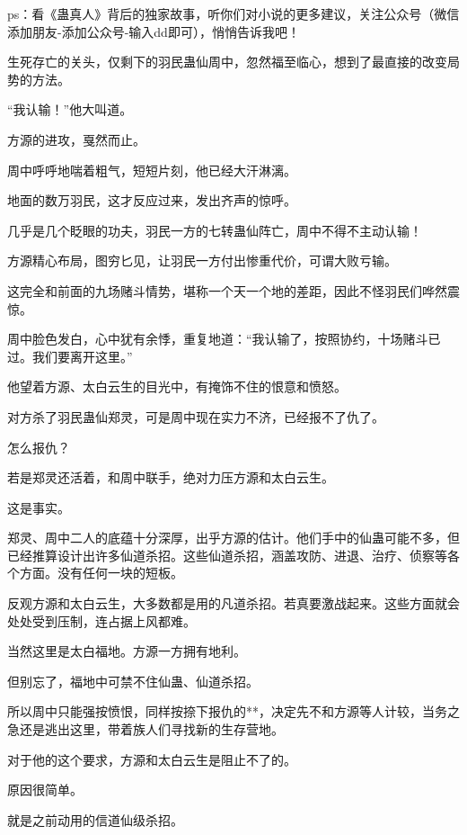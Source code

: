 
\begin{this_body}

ps：看《蛊真人》背后的独家故事，听你们对小说的更多建议，关注公众号（微信添加朋友-添加公众号-输入dd即可），悄悄告诉我吧！

生死存亡的关头，仅剩下的羽民蛊仙周中，忽然福至临心，想到了最直接的改变局势的方法。

“我认输！”他大叫道。

方源的进攻，戛然而止。

周中呼呼地喘着粗气，短短片刻，他已经大汗淋漓。

地面的数万羽民，这才反应过来，发出齐声的惊呼。

几乎是几个眨眼的功夫，羽民一方的七转蛊仙阵亡，周中不得不主动认输！

方源精心布局，图穷匕见，让羽民一方付出惨重代价，可谓大败亏输。

这完全和前面的九场赌斗情势，堪称一个天一个地的差距，因此不怪羽民们哗然震惊。

周中脸色发白，心中犹有余悸，重复地道：“我认输了，按照协约，十场赌斗已过。我们要离开这里。”

他望着方源、太白云生的目光中，有掩饰不住的恨意和愤怒。

对方杀了羽民蛊仙郑灵，可是周中现在实力不济，已经报不了仇了。

怎么报仇？

若是郑灵还活着，和周中联手，绝对力压方源和太白云生。

这是事实。

郑灵、周中二人的底蕴十分深厚，出乎方源的估计。他们手中的仙蛊可能不多，但已经推算设计出许多仙道杀招。这些仙道杀招，涵盖攻防、进退、治疗、侦察等各个方面。没有任何一块的短板。

反观方源和太白云生，大多数都是用的凡道杀招。若真要激战起来。这些方面就会处处受到压制，连占据上风都难。

当然这里是太白福地。方源一方拥有地利。

但别忘了，福地中可禁不住仙蛊、仙道杀招。

所以周中只能强按愤恨，同样按捺下报仇的**，决定先不和方源等人计较，当务之急还是逃出这里，带着族人们寻找新的生存营地。

对于他的这个要求，方源和太白云生是阻止不了的。

原因很简单。

就是之前动用的信道仙级杀招。


\end{this_body}
